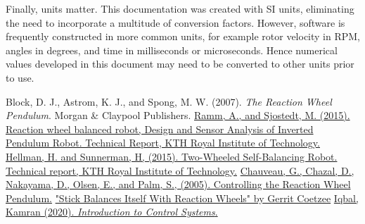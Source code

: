 \documentclass[12pt,letterpaper]{article}
\begin{document}
Finally, units matter.  This documentation was created with SI units, eliminating the need to incorporate a multitude of conversion factors.  However, software is frequently constructed in more common units, for example rotor velocity in RPM, angles in degrees, and time in milliseconds or microseconds.  Hence numerical values developed in this document may need to
be converted to other units prior to use.







 
\begin{thebibliography}{99}
 Block, D. J., Astrom, K. J., and Spong, M. W. (2007).  \emph{The Reaction Wheel Pendulum}. Morgan \& Claypool Publishers.
 \href{http://www.diva-portal.se/smash/get/diva2:916271/FULLTEXT01.pdf}{Ramm, A., and Sjostedt, M. (2015). Reaction wheel balanced robot, Design and Sensor Analysis of Inverted Pendulum Robot. Technical Report, KTH Royal Institute of Technology.}
 \href{https://kth.diva-portal.org/smash/get/diva2:916184/FULLTEXT01.pdf}{Hellman, H. and Sunnerman, H, (2015).  Two-Wheeled Self-Balancing Robot. Technical report, KTH Royal Institute of Technology.}
 \href{http://geoffrey.chauveau.free.fr/pendulum/reports/final_report.pdf}{Chauveau, G., Chazal, D., Nakayama, D., Olsen, E., and Palm, S., (2005).  Controlling the Reaction Wheel Pendulum.}
 \href{https://hackaday.com/2016/08/11/stick-balances-itself-with-reaction-wheels/}{"Stick Balances Itself With Reaction Wheels" by Gerrit Coetzee}
 \href{https://eng.libretexts.org/Bookshelves/Industrial_and_Systems_Engineering/Book%3A_Introduction_to_Control_Systems_(Iqbal)/08%3A_State_Variable_Models/8.04%3A_Linear_Transformation_of_State_Variables}{Iqbal, Kamran (2020).  \emph{Introduction to Control Systems}.}
\end{thebibliography}
\end{document}
